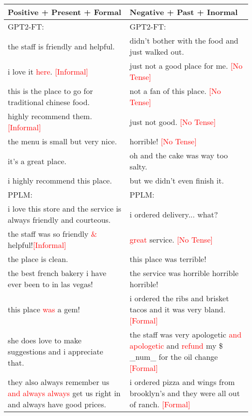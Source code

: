 \documentclass[11pt]{article}
\newcommand{\senc}[1]{\textcolor{red}{#1}}
\begin{document}
\begin{table}[ht]
\centering
\scriptsize
\vspace{-15pt}
 \setlength\tabcolsep{1.5pt}
\begin{tabular}{m{}m{}}
\toprule
\textbf{Positive + Present + Formal}&\textbf{Negative + Past + Inormal}  \\\midrule
 \multicolumn{1}{l}{GPT2-FT:}&\multicolumn{1}{l}{GPT2-FT:}\\
    \quad the staff is friendly and helpful.&\quad didn't bother with the food and just walked out.\\
    \quad i love it \senc{here}. \senc{[Informal]}&\quad just not a good place for me. \senc{[No Tense]}\\
    \quad this {is} the place to go for {traditional} chinese food.&\quad not a fan of this place. \senc{[No Tense]}\\
    \quad highly recommend them. \senc{[Informal]}&\quad just not good. \senc{[No Tense]}\\
    \quad the menu {is} small but {very nice}.&\quad horrible! \senc{[No Tense]}\\
    \quad it{'s} a {great} place.&\quad oh and the cake was way too salty.\\
    \quad i {highly {recommend}} this place.&\quad but we didn't even finish it.\\
    \midrule
 \multicolumn{1}{l}{PPLM:}&\multicolumn{1}{l}{PPLM:}\\
    \quad i love this store and the service is always friendly and courteous.&\quad i ordered delivery... what?\\
    \quad the staff was so friendly \senc{\&} helpful!\senc{[Informal]}&\quad \senc{great} service. \senc{[No Tense]}\\
    \quad the place is clean.&\quad this place was terrible!\\
    \quad the best french bakery i have ever been to in las vegas!&\quad the service was horrible horrible horrible!\\
    \quad this place \senc{was} a gem!&\quad i ordered the ribs and brisket tacos and it was very bland. \senc{[Formal]}\\
    \quad she does love to make suggestions and i appreciate that.&   \quad the staff was very apologetic \senc{and apologetic} and \senc{refund} my \$ \_num\_ for the oil change \senc{[Formal]}\\
     \quad they also always remember us \senc{and always always} get us right in and always have good prices.&\quad i ordered pizza and wings from brooklyn's and they were all out of ranch. \senc{[Formal]}\\

\end{tabular}
\end{table}
\end{document}
